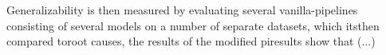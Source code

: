     Generalizability is then measured by evaluating several vanilla-pipelines consisting of several models on a number of separate datasets, which itsthen compared toroot causes, the results of the modified piresults show that (...)
    
   

